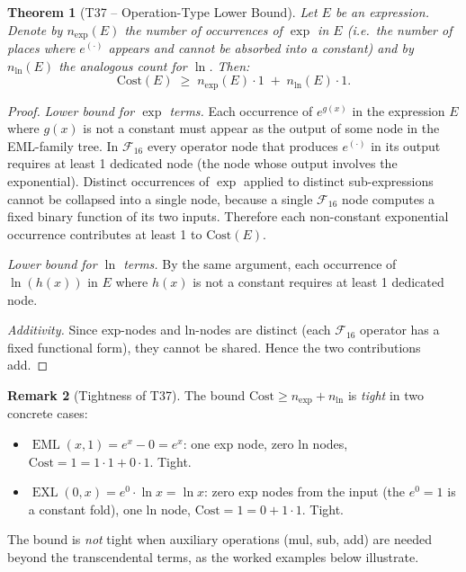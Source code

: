 \documentclass[12pt,a4paper]{article}
\newtheorem{theorem}{Theorem}[section]
\theoremstyle{definition}
\newtheorem{remark}[theorem]{Remark}
\newcommand{\EML}{\operatorname{EML}}
\newcommand{\EXL}{\operatorname{EXL}}
\newcommand{\Cost}{\mathrm{Cost}}
\newcommand{\Fam}{\mathcal{F}}
\begin{document}
\begin{theorem}[T37 -- Operation-Type Lower Bound]\label{thm:T37}
Let $E$ be an expression.  Denote by $n_{\exp}(E)$ the number of occurrences
of $\exp$ in $E$ (i.e.\ the number of places where $e^{(\cdot)}$ appears and
cannot be absorbed into a constant) and by $n_{\ln}(E)$ the analogous count
for $\ln$.  Then:
\[
  \Cost(E) \;\geq\; n_{\exp}(E) \cdot 1 \;+\; n_{\ln}(E) \cdot 1.
\]
\end{theorem}

\begin{proof}
\emph{Lower bound for $\exp$ terms.}
Each occurrence of $e^{g(x)}$ in the expression $E$ where $g(x)$ is not a
constant must appear as the output of some node in the EML-family tree.  In
$\Fam_{16}$ every operator node that produces $e^{(\cdot)}$ in its output
requires at least 1 dedicated node (the node whose output involves the
exponential).  Distinct occurrences of $\exp$ applied to distinct
sub-expressions cannot be collapsed into a single node, because a single
$\Fam_{16}$ node computes a fixed binary function of its two inputs.
Therefore each non-constant exponential occurrence contributes at least 1 to
$\Cost(E)$.

\emph{Lower bound for $\ln$ terms.}
By the same argument, each occurrence of $\ln(h(x))$ in $E$ where $h(x)$ is
not a constant requires at least 1 dedicated node.

\emph{Additivity.}
Since exp-nodes and ln-nodes are distinct (each $\Fam_{16}$ operator has a
fixed functional form), they cannot be shared.  Hence the two contributions
add.
\end{proof}

\begin{remark}[Tightness of T37]\label{rem:T37tight}
The bound $\Cost \geq n_{\exp} + n_{\ln}$ is \emph{tight} in two concrete
cases:
\begin{itemize}
  \item $\EML(x,1) = e^x - 0 = e^x$: one exp node, zero ln nodes,
        $\Cost = 1 = 1 \cdot 1 + 0 \cdot 1$.  Tight.
  \item $\EXL(0,x) = e^0 \cdot \ln x = \ln x$: zero exp nodes from the input
        (the $e^0 = 1$ is a constant fold), one ln node,
        $\Cost = 1 = 0 + 1 \cdot 1$.  Tight.
\end{itemize}
The bound is \emph{not} tight when auxiliary operations (mul, sub, add) are
needed beyond the transcendental terms, as the worked examples below illustrate.
\end{remark}
\end{document}
